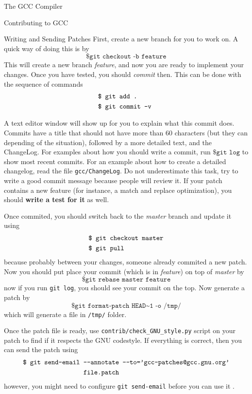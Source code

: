 \begin{section}{The GCC Compiler}
\begin{section}{Contributing to GCC}
\begin{subsection}{Writing and Sending Patches}
	First, create a new branch for you to work on. A quick way of doing
	this is by
	$$\texttt{\$ git checkout -b feature}$$
	This will create a new branch \textit{feature}, and
	now you are ready to implement your changes. Once you have tested, you should
	\textit{commit} then. This can be done with the sequence of commands
\begin{align}
\texttt{\$ } & \texttt{git add .} \nonumber \\
\texttt{\$ } & \texttt{git commit -v \nonumber}
\end{align}

	A text editor window will show up for you to explain what this
	commit does. Commits have a title that should not have more than
	60 characters (but they can depending of the situation),
	followed by a more detailed text, and the
	ChangeLog. For examples about how you should write a commit,
	run $\texttt{\$ git log}$ to show most recent commits. For an example
	about how to create a detailed changelog, read the file
	\texttt{gcc/ChangeLog}. Do not underestimate this task, try to
	write a good commit message because people will review it.
	If your patch contains a new feature (for instance, a match and
	replace optimization), you should \textbf{write a test for it} as
	well.

	Once commited, you should switch back to the \textit{master} branch
	and update it using
\begin{align}
\texttt{\$ } & \texttt{git checkout master} \nonumber \\
\texttt{\$ } & \texttt{git pull \nonumber}
\end{align}
	because probably between your changes, someone already commited a new
	patch. Now you should put place your commit (which is in \textit{feature})
	on top of \textit{master} by
	$$\texttt{\$ git rebase master feature}$$
	now if you run \texttt{git log}, you should see your commit on the top.
	Now generate a patch by
	$$\texttt{\$ git format-patch HEAD\textasciitilde1 -o /tmp/}$$
	which will generate a file in \texttt{/tmp/} folder.

	Once the patch file is ready, use \texttt{contrib/check\_GNU\_style.py}
	script on your patch to find if it respects the GNU codestyle. If
	everything is correct, then you can send the patch using
\begin{align}
\texttt{\$ git send-email} & \texttt{ -{}-annotate  -{}-to='gcc-patches@gcc.gnu.org'} \nonumber \\
& \texttt{ file.patch \nonumber}
\end{align}
	however, you might need to configure \texttt{git send-email} before you can use it
	\citep{flusp_tavares}.


\end{subsection}
\end{section}
\end{section}
